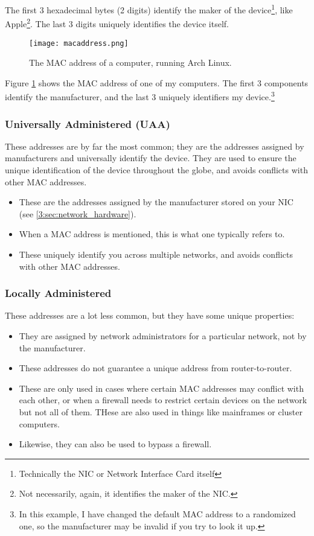 \documentclass[../main.tex]{subfiles}
\begin{document}
The first 3 hexadecimal bytes (2 digits) identify the maker of the device\footnote{Technically the NIC or Network Interface Card itself}, like Apple\footnote{Not necessarily, again, it identifies the maker of the NIC.}. The last 3 digits uniquely identifies the device itself.

\begin{figure}[ht]
    \centering
    \texttt{[image: macaddress.png]}
    \caption{The MAC address of a computer, running Arch Linux.}
    \label{fig:macaddress}
\end{figure}

Figure \ref{fig:macaddress} shows the MAC address of one of my computers. The first 3 components identify the manufacturer, and the last 3 uniquely identifiers my device.\footnote{In this example, I have changed the default MAC address to a randomized one, so the manufacturer may be invalid if you try to look it up.}

\subsubsection{Universally Administered (UAA)}

These addresses are by far the most common; they are the addresses assigned by manufacturers and universally identify the device. They are used to ensure the unique identification of the device throughout the globe, and avoids conflicts with other MAC addresses.

\begin{itemize}
    \item These are the addresses assigned by the manufacturer stored on your NIC (see \ref{3:sec:network_hardware}).
    \item When a MAC address is mentioned, this is what one typically refers to.
    \item These uniquely identify you across multiple networks, and avoids conflicts with other MAC addresses.
\end{itemize}

\subsubsection{Locally Administered}

These addresses are a lot less common, but they have some unique properties:

\begin{itemize}
    \item They are assigned by network administrators for a particular network, not by the manufacturer.
    \item These addresses do not guarantee a unique address from router-to-router.
    \item These are only used in cases where certain MAC addresses may conflict with each other, or when a firewall needs to restrict certain devices on the network but not all of them. THese are also used in things like mainframes or cluster computers.
    \item Likewise, they can also be used to bypass a firewall.
\end{itemize}
\end{document}
